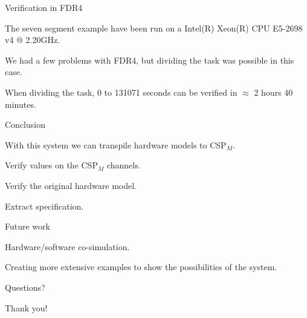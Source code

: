\documentclass[13pt]{beamer}
\newcommand{\cspm}{CSP$_M$}
\begin{document}
%
\begin{frame}{Verification in FDR4}
 \begin{block}{}
     The seven segment example have been run on a Intel(R) Xeon(R) CPU E5-2698 v4 @ 2.20GHz.

     \vspace{5mm}
     We had a few problems with FDR4, but dividing the task was possible in this case.

     \vspace{5mm}
     When dividing the task, 0 to 131071 seconds can be verified in $\approx$ 2 hours 40 minutes.
 \end{block}
\end{frame}
%
\begin{frame}{Conclusion}
 \begin{block}{}
  With this system we can transpile hardware models to \cspm{}.
 \end{block}

 \pause

 \begin{block}{}
  Verify values on the \cspm{} channels.
 \end{block}

 \pause

 \begin{block}{}
  Verify the original hardware model.
 \end{block}

 \pause

 \begin{block}{}
  Extract specification.
 \end{block}

\end{frame}
%
\begin{frame}{Future work}
 \begin{block}{}
     Hardware/software co-simulation.
 \end{block}

 \pause

 \begin{block}{}
     Creating more extensive examples to show the possibilities of the system.
 \end{block}

\end{frame}
%
\begin{frame}{Questions?}
	\begin{block}{}
        Thank you!
	\end{block}
\end{frame}
\end{document}
